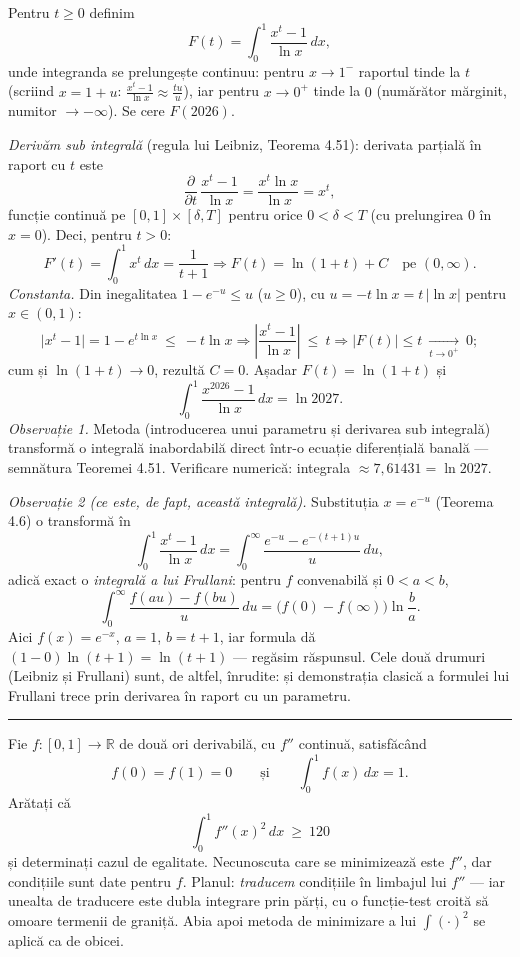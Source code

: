 Pentru $t\ge0$ definim
\[ F(t)=\int_0^1\frac{x^{t}-1}{\ln x}\,dx , \]
unde integranda se prelungește continuu: pentru $x\to1^-$ raportul tinde la $t$ (scriind $x=1+u$: $\frac{x^t-1}{\ln x}\approx\frac{tu}{u}$), iar pentru $x\to0^+$ tinde la $0$ (numărător mărginit, numitor $\to-\infty$). Se cere $F(2026)$.

\emph{Derivăm sub integrală} (regula lui Leibniz, Teorema 4.51): derivata parțială în raport cu $t$ este
\[ \frac{\partial}{\partial t}\,\frac{x^t-1}{\ln x}=\frac{x^t\ln x}{\ln x}=x^t , \]
funcție continuă pe $[0,1]\times[\delta,T]$ pentru orice $0<\delta<T$ (cu prelungirea $0$ în $x=0$). Deci, pentru $t>0$:
\[ F'(t)=\int_0^1x^t\,dx=\frac1{t+1} \Longrightarrow F(t)=\ln(1+t)+C\quad\text{pe }(0,\infty). \]
\emph{Constanta.} Din inegalitatea $1-e^{-u}\le u$ ($u\ge0$), cu $u=-t\ln x=t\,|\ln x|$ pentru $x\in(0,1)$:
\[ \bigl|x^t-1\bigr|=1-e^{t\ln x}\ \le\ -t\ln x \Longrightarrow \left|\frac{x^t-1}{\ln x}\right|\ \le\ t \Longrightarrow |F(t)|\le t\ \xrightarrow[t\to0^+]{}\ 0 ; \]
cum și $\ln(1+t)\to0$, rezultă $C=0$. Așadar $F(t)=\ln(1+t)$ și
\[ \int_0^1\frac{x^{2026}-1}{\ln x}\,dx=\ln 2027 . \]
\emph{Observație 1.} Metoda (introducerea unui parametru și derivarea sub integrală) transformă o integrală inabordabilă direct într-o ecuație diferențială banală --- semnătura Teoremei 4.51. Verificare numerică: integrala $\approx7{,}61431=\ln2027$.

\emph{Observație 2 (ce este, de fapt, această integrală).} Substituția $x=e^{-u}$ (Teorema 4.6) o transformă în
\[ \int_0^1\frac{x^{t}-1}{\ln x}\,dx=\int_0^{\infty}\frac{e^{-u}-e^{-(t+1)u}}{u}\,du , \]
adică exact o \emph{integrală a lui Frullani}: pentru $f$ convenabilă și $0<a<b$,
\[ \int_0^{\infty}\frac{f(au)-f(bu)}{u}\,du=\bigl(f(0)-f(\infty)\bigr)\ln\frac ba . \]
Aici $f(x)=e^{-x}$, $a=1$, $b=t+1$, iar formula dă $(1-0)\ln(t+1)=\ln(t+1)$ --- regăsim răspunsul. Cele două drumuri (Leibniz și Frullani) sunt, de altfel, înrudite: și demonstrația clasică a formulei lui Frullani trece prin derivarea în raport cu un parametru.
\vspace{1mm}\hrule

Fie $f:[0,1]\to\mathbb{R}$ de două ori derivabilă, cu $f''$ continuă, satisfăcând
\[ f(0)=f(1)=0\qquad\text{și}\qquad\int_{0}^{1}f(x)\,dx=1 . \]
Arătați că
\[ \int_{0}^{1}f''(x)^{2}\,dx\ \ge\ 120 \]
și determinați cazul de egalitate.
\sol Necunoscuta care se minimizează este $f''$, dar condițiile sunt date pentru $f$. Planul: \emph{traducem} condițiile în limbajul lui $f''$ --- iar unealta de traducere este dubla integrare prin părți, cu o funcție-test croită să omoare termenii de graniță. Abia apoi metoda de minimizare a lui $\int(\cdot)^{2}$ se aplică ca de obicei.

